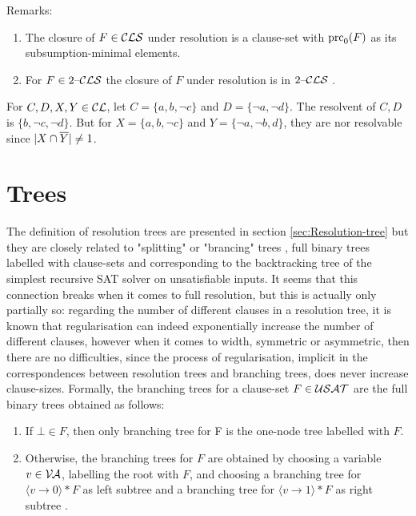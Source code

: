 \documentclass[12pt]{book}
\begin{document}
 Remarks:
\begin{enumerate}
\item The closure of $F \in \mathcal{CLS}$ under resolution is a clause-set with $\operatorname{prc}_0(F)$ as its subsumption-minimal elements.
\item For $F \in 2\mbox{--}\mathcal{CLS}$ the closure of $F$ under resolution is in $2\mbox{--}\mathcal{CLS}$ \cite{h5}.
\end{enumerate}

\begin{examp}\label{exp:resolution1}
       For $C,D,X,Y \in \mathcal{CL}$, let $C=\{a,b, \neg c\}$ and $D=\{\neg a, \neg d\}$. The resolvent of $C,D$ is $\{b, \neg c, \neg d\}$.
	   But for $X=\{a,b, \neg c\}$ and $Y=\{\neg a, \neg b, d\}$, they are nor resolvable since $\lvert X \cap \overline Y  \rvert \not = 1$.
\end{examp}
\section{Trees}
\label{sec:Trees}

The definition of resolution trees are presented in section \ref{sec:Resolution-tree} but they are closely related to "splitting" or "brancing" trees , full binary trees labelled with clause-sets and corresponding 
to the backtracking tree of the simplest recursive SAT solver on unsatisfiable inputs. It seems that this connection breaks when it comes 
to full resolution, but this is actually only partially so: regarding the number of different clauses in a resolution tree, it is known 
that regularisation can indeed exponentially increase the number of different clauses, however when it comes to width, symmetric or 
asymmetric, then there are no difficulties, since the process of regularisation, implicit in the correspondences between resolution
trees and branching trees, does never increase clause-sizes.
Formally, the branching trees for a clause-set $F \in \mathcal{USAT}$ are the full binary trees obtained as follows:
\begin{enumerate}
\item If $\bot \in F$, then only branching tree for F is the one-node tree labelled with $F$.
\item Otherwise, the branching trees for $F$ are obtained by choosing a variable $v \in \mathcal{V\hspace{-0.1em}A}$, labelling the root with $F$, and choosing 
a branching tree for $\langle v \rightarrow 0 \rangle * F$ as left subtree and a branching tree for $\langle v \rightarrow 1 \rangle * F$ as right subtree \cite{h5}.
\end{enumerate}
\end{document}
